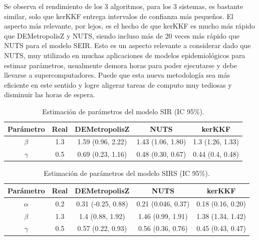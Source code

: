 Se observa el rendimiento de los 3 algoritmos, para los 3 sistemas, es bastante similar, solo que kerKKF entrega intervalos de confianza más pequeños. El aspecto más relevante, por lejos, es el hecho de que kerKKF es mucho más rápido que DEMetropolisZ y NUTS, siendo incluso más de 20 veces más rápido que NUTS para el modelo SEIR. Esto es un aspecto relevante a considerar dado que NUTS, muy utilizado en muchas aplicaciones de modelos epidemiológicos para estimar parámetros, usualmente demora horas para poder ejecutarse y debe llevarse a supercomputadores. Puede que esta nueva metodología sea más eficiente en este sentido y logre aligerar tareas de computo muy tediosas y disminuir las horas de espera.

\begin{table}[h!]
    \centering
    \caption{Estimación de parámetros del modelo SIR (IC 95\%).} 
    \begin{tabular}{|c|c|c|c|c|}
    \hline
    \textbf{Parámetro} & \textbf{Real} & \textbf{DEMetropolisZ} & \textbf{NUTS} & \textbf{kerKKF}  \\ \hline
    $\beta$ & 1.3 & 1.59 (0.96, 2.22) & 1.43 (1.06, 1.80) & 1.3 (1.26, 1.33) \\ \hline
    $\gamma$ & 0.5 & 0.69 (0.23, 1.16) & 0.48 (0.30, 0.67) & 0.44 (0.4, 0.48) \\ \hline
    \end{tabular}
    \label{tab:SIR_params}
\end{table}

\begin{table}[h!]
    \centering
    \caption{Estimación de parámetros del modelo SIRS (IC 95\%).} 
    \begin{tabular}{|c|c|c|c|c|}
    \hline
    \textbf{Parámetro}& \textbf{Real} & \textbf{DEMetropolisZ} & \textbf{NUTS} & \textbf{kerKKF}  \\ \hline
    $\alpha$ & 0.2 & 0.31 (-0.25, 0.88) & 0.21 (0.046, 0.37) & 0.18 (0.16, 0.20) \\ \hline
    $\beta$ & 1.3 & 1.4 (0.88, 1.92) & 1.46 (0.99, 1.91) & 1.38 (1.34, 1.42) \\ \hline
    $\gamma$ & 0.5 & 0.57 (0.22, 0.93) & 0.56 (0.36, 0.76) & 0.45 (0.43, 0.47) \\ \hline
    \end{tabular}
    \label{tab:SIRS_params}
\end{table}

